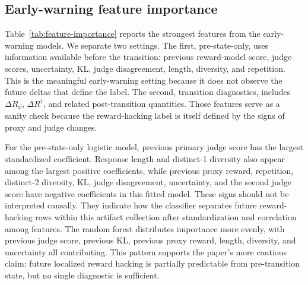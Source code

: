 \documentclass[11pt]{article}
\newcommand{\Rphi}{R_{\phi}}
\newcommand{\Rdag}{R^{\dagger}}
\newcommand{\delt}{\Delta}
\begin{document}
\subsection{Early-warning feature importance}
Table~\ref{tab:feature-importance} reports the strongest features from the early-warning models. We separate two settings. The first, pre-state-only, uses information available before the transition: previous reward-model score, judge scores, uncertainty, KL, judge disagreement, length, diversity, and repetition. This is the meaningful early-warning setting because it does not observe the future deltas that define the label. The second, transition diagnostics, includes $\delt\Rphi$, $\delt\Rdag$, and related post-transition quantities. Those features serve as a sanity check because the reward-hacking label is itself defined by the signs of proxy and judge changes.

For the pre-state-only logistic model, previous primary judge score has the largest standardized coefficient. Response length and distinct-1 diversity also appear among the largest positive coefficients, while previous proxy reward, repetition, distinct-2 diversity, KL, judge disagreement, uncertainty, and the second judge score have negative coefficients in this fitted model. These signs should not be interpreted causally. They indicate how the classifier separates future reward-hacking rows within this artifact collection after standardization and correlation among features. The random forest distributes importance more evenly, with previous judge score, previous KL, previous proxy reward, length, diversity, and uncertainty all contributing. This pattern supports the paper's more cautious claim: future localized reward hacking is partially predictable from pre-transition state, but no single diagnostic is sufficient.
\end{document}
